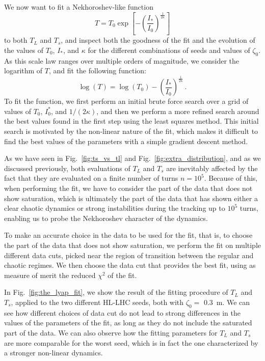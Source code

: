 We now want to fit a Nekhoroshev-like function
\begin{equation}
    T = T_0 \exp\left[-\left(\frac{I_\ast}{I_0}\right)^{\frac{1}{2\kappa}}\right]
\end{equation} 
to both $T_L$ and $T_s$, and inspect both the goodness of the fit and the evolution of the values of $T_0$, $I_\ast$, and $\kappa$ for the different combinations of seeds and values of $\zeta_0$. As this scale law ranges over multiple orders of magnitude, we consider the logarithm of $T$, and fit the following function:
\begin{equation}
    \log(T) = \log(T_0) - \left(\frac{I_\ast}{I_0}\right)^{\frac{1}{2\kappa}} \,.
\end{equation}
To fit the function, we first perform an initial brute force search over a grid of values of $T_0$, $I_0^*$, and $1/(2\kappa)$, and then we perform a more refined search around the best values found in the first step using the least squares method. This initial search is motivated by the non-linear nature of the fit, which makes it difficult to find the best values of the parameters with a simple gradient descent method.

As we have seen in Fig.~\ref{fig:ts_vs_tl} and Fig.~\ref{fig:extra_distribution}, and as we discussed previously, both evaluations of $T_L$ and $T_s$ are inevitably affected by the fact that they are evaluated on a finite number of turns $n=10^5$. Because of this, when performing the fit, we have to consider the part of the data that does not show saturation, which is ultimately the part of the data that has shown either a clear chaotic dynamics or strong instabilities during the tracking up to $10^5$ turns, enabling us to probe the Nekhoroshev character of the dynamics.

To make an accurate choice in the data to be used for the fit, that is, to choose the part of the data that does not show saturation, we perform the fit on multiple different data cuts, picked near the region of transition between the regular and chaotic regimes. We then choose the data cut that provides the best fit, using as measure of merit the reduced $\chi^2$ of the fit.

In Fig.~\ref{fig:the_lyap_fit}, we show the result of the fitting procedure of $T_L$ and $T_s$, applied to the two different HL-LHC seeds, both with $\zeta_0=$ \SI{0.3}{\meter}. We can see how different choices of data cut do not lead to strong differences in the values of the parameters of the fit, as long as they do not include the saturated part of the data. We can also observe how the fitting parameters for $T_L$ and $T_s$ are more comparable for the worst seed, which is in fact the one characterized by a stronger non-linear dynamics.

